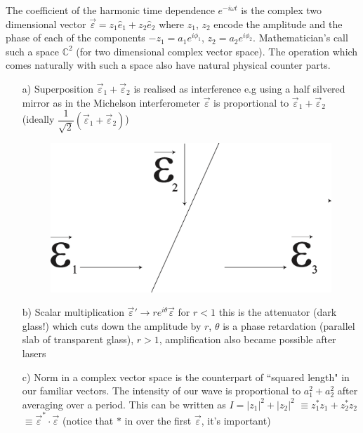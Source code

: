 The coefficient of the harmonic time dependence $e^{-i \omega t}$ is the complex two dimensional vector
$\overrightarrow{\varepsilon} = z_1 \hat{e}_1 + z_2 \hat{e}_2$ where $z_1$, $z_2$ encode the amplitude and the phase of each of
the components $- z_1 = a_1 e^{i \phi_1}$, $z_2 = a_2 e^{i\phi_2}$. Mathematician's call such a space
$\mathbb{C}^2$ (for two dimensional complex vector space). The operation which comes
naturally with such a space also have natural physical counter parts.
\begin{itemize}
\item[a)] Superposition $\overrightarrow{\varepsilon}_1 + \overrightarrow{\varepsilon}_2$ is realised as interference e.g using a half silvered
mirror as in the Michelson interferometer $\overrightarrow{\varepsilon}$ is proportional to $\overrightarrow{\varepsilon}_1 + \overrightarrow{\varepsilon}_2$ (ideally
$\dfrac{1}{\sqrt{2}} (\overrightarrow{\varepsilon}_1 + \overrightarrow{\varepsilon}_2)$)
\begin{figure}[H]
\centering
\includegraphics[scale=0.1]{src/images/chap26/1.eps}
\end{figure}

\item[b)] Scalar multiplication $\overrightarrow{\varepsilon}' \to re^{i\theta} \overrightarrow{\varepsilon}$ for $r < 1$ this is the attenuator (dark
glass!) which cuts down the amplitude by $r$, $\theta$ is a phase retardation (parallel slab of transparent glass), $r > 1$, amplification also became possible after lasers


\item[c)] Norm in a complex vector space is the counterpart of ``squared length" in
our familiar vectors. The intensity of our wave is proportional to $a_1^2 + a_2^2$ after
averaging over a period. This can be written as $I = | z_1 |^2 + | z_2 |^2$ $\equiv z^{\ast}_1 z_1 + z^{\ast}_2 z_2$ $\equiv \overrightarrow{\varepsilon}^{\ast} \cdot \overrightarrow{\varepsilon}$ (notice that $\ast$ in over the first $\overrightarrow{\varepsilon}$, it's important)


\end{itemize}

